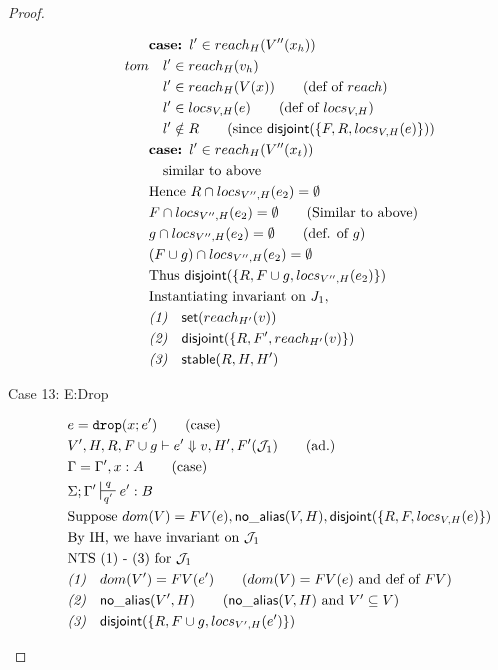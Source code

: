 \documentclass[sigconf]{acmart}
\newcommand{\ms}[1]{\ensuremath{\mathsf{#1}}}
\newcommand{\irl}[1]{\mathtt{#1}}
\newcommand{\na}[1]{\mathsf{no\_alias}(#1)}
\newcommand{\stable}[1]{\mathsf{stable}(#1)}
\newcommand{\dist}[1]{\mathsf{disjoint}(#1)}
\theoremstyle{definition}
\begin{document}
\begin{proof}
\begin{description}
\begin{align*}
  &\textbf{case: }  l' \in reach_{H}(V''(x_h)) \\tom
  &\quad l' \in reach_{H}(v_h)\\
  &\quad l' \in reach_{H}(V(x)) \tag{def of $reach$}\\
  &\quad l' \in locs_{V,H}(e) \tag{def of $locs_{V,H}$}\\
  &\quad l' \notin R \tag{since $\dist{\{F,R,locs_{V,H}(e)\}}$}\\
  &\textbf{case: }  l' \in reach_{H}(V''(x_t)) \\
  &\quad \text{similar to above}\\
  &\text{Hence } R \cap locs_{V'',H}(e_2) = \emptyset\\
  &F \cap locs_{V'',H}(e_2) = \emptyset \tag{Similar to above}\\
  &g \cap locs_{V'',H}(e_2) = \emptyset \tag{def. of $g$}\\
  &(F \cup g) \cap locs_{V'',H}(e_2) = \emptyset\\
  &\text{Thus } \dist{\{R,F \cup g,locs_{V'',H}(e_2)\}}\\
  &\text{Instantiating invariant on } J_1,\\
  &\emph{(1)} \quad \ms{set}(reach_{H'}(v))\\
  &\emph{(2)} \quad\dist{\{R,F',reach_{H'}(v)\}}\\
  &\emph{(3)} \quad\stable{R,H,H'}\\
  \end{align*}
  \item [Case 13: E:Drop]
  \begin{align*}
  &e = \irl{drop}(x;e') \tag{case}\\
  &V',H,R,F \cup g \vdash e' \Downarrow v,H',F' (\mathcal{J}_1) \tag{ad.}\\
  &\Gamma = \Gamma',x:A \tag{case}\\
  &\Sigma;\Gamma' \sststile{q'}{q} e' : B\\
  &\text{Suppose } dom(V) = FV(e), \na{V,H},\dist{\{R,F,locs_{V,H}(e)\}}\\
  &\text{By IH, we have invariant on } \mathcal{J}_1\\
  &\text{NTS (1) - (3) for } \mathcal{J}_1\\
  &\emph{(1)} \quad dom(V') = FV(e') \tag{$dom(V) = FV(e)$ and def of $FV$}\\
  &\emph{(2)} \quad \na{V',H} \tag{$\na{V,H}$ and $V' \subseteq V$}\\
  &\emph{(3)} \quad \dist{\{R,F \cup g,locs_{V',H}(e')\}}\\

\end{align*}
\end{description}
\end{proof}
\end{document}
